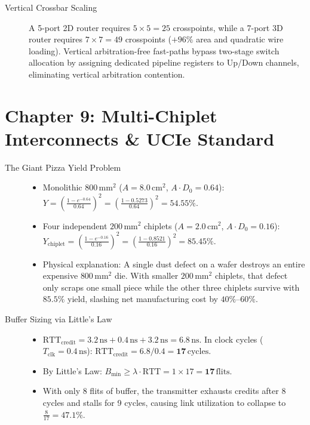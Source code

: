 \begin{description}
    \item[Vertical Crossbar Scaling] A 5-port 2D router requires $5 \times 5 = 25$ crosspoints, while a 7-port 3D router requires $7 \times 7 = 49$ crosspoints ($+96\%$ area and quadratic wire loading). Vertical arbitration-free fast-paths bypass two-stage switch allocation by assigning dedicated pipeline registers to Up/Down channels, eliminating vertical arbitration contention.
\end{description}

\section*{Chapter 9: Multi-Chiplet Interconnects \& UCIe Standard}

\begin{description}
    \item[The Giant Pizza Yield Problem]
    \begin{itemize}
        \item Monolithic $800\,\mathrm{mm^2}$ ($A = 8.0\,\mathrm{cm^2}$, $A \cdot D_0 = 0.64$):
        $Y = \left(\frac{1 - e^{-0.64}}{0.64}\right)^2 = \left(\frac{1 - 0.5273}{0.64}\right)^2 = \mathbf{54.55\%}$.
        \item Four independent $200\,\mathrm{mm^2}$ chiplets ($A = 2.0\,\mathrm{cm^2}$, $A \cdot D_0 = 0.16$):
        $Y_{\mathrm{chiplet}} = \left(\frac{1 - e^{-0.16}}{0.16}\right)^2 = \left(\frac{1 - 0.8521}{0.16}\right)^2 = \mathbf{85.45\%}$.
        \item Physical explanation: A single dust defect on a wafer destroys an entire expensive $800\,\mathrm{mm^2}$ die. With smaller $200\,\mathrm{mm^2}$ chiplets, that defect only scraps one small piece while the other three chiplets survive with $85.5\%$ yield, slashing net manufacturing cost by $40\%$--$60\%$.
    \end{itemize}

    \item[Buffer Sizing via Little's Law]
    \begin{itemize}
        \item $\mathrm{RTT}_{\mathrm{credit}} = 3.2\,\mathrm{ns} + 0.4\,\mathrm{ns} + 3.2\,\mathrm{ns} = 6.8\,\mathrm{ns}$. In clock cycles ($T_{\mathrm{clk}} = 0.4\,\mathrm{ns}$): $\mathrm{RTT}_{\mathrm{credit}} = 6.8 / 0.4 = \mathbf{17\,\mathrm{cycles}}$.
        \item By Little's Law: $B_{\mathrm{min}} \ge \lambda \cdot \mathrm{RTT} = 1 \times 17 = \mathbf{17\,\mathrm{flits}}$.
        \item With only 8 flits of buffer, the transmitter exhausts credits after 8 cycles and stalls for 9 cycles, causing link utilization to collapse to $\frac{8}{17} = \mathbf{47.1\%}$.
    \end{itemize}


\end{description}
